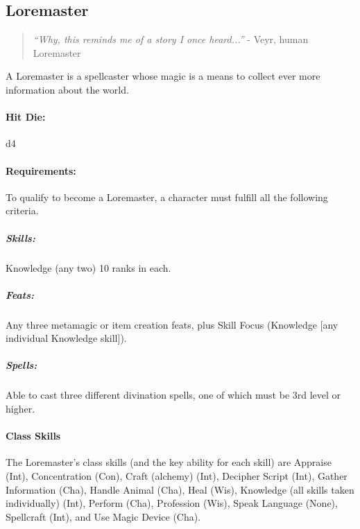 \subsection{Loremaster}
\begin{quote}
\emph{``Why, this reminds me of a story I once heard...''}
- Veyr, human Loremaster
\end{quote}
A Loremaster is a spellcaster whose magic is a means to collect ever more information about the world.
\paragraph{Hit Die:} d4
\paragraph{Requirements:}
To qualify to become a Loremaster, a character must fulfill all the following criteria.
\subparagraph{Skills:} Knowledge (any two) 10 ranks in each.
\subparagraph{Feats:} Any three metamagic or item creation feats, plus Skill Focus (Knowledge [any individual Knowledge skill]).
\subparagraph{Spells:} Able to cast three different divination spells, one of which must be 3rd level or higher.
\paragraph{Class Skills}
The Loremaster's class skills (and the key ability for each skill) are Appraise (Int), Concentration (Con), Craft (alchemy) (Int), Decipher Script (Int), Gather Information (Cha), Handle Animal (Cha), Heal (Wis), Knowledge (all skills taken individually) (Int), Perform (Cha), Profession (Wis), Speak Language (None), Spellcraft (Int), and Use Magic Device (Cha).
